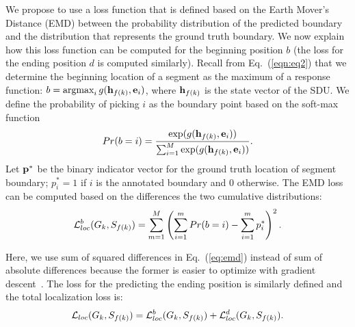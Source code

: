 \documentclass[10pt,journal,compsoc]{IEEEtran}
\begin{document}

 We propose to use a loss function that is defined based on the Earth Mover's Distance (EMD) between the probability distribution of the predicted boundary and the distribution that represents the ground truth boundary. We now explain how this loss function can be computed for the beginning position $b$ (the loss for the ending position $d$ is computed similarly).  Recall from Eq.~(\ref{eqn:eq2}) that  we determine the beginning location of a segment as the maximum of a response function: $b =  \mathop{\textrm{argmax}}_{i} g({\bf h}_{f(k)}, {\bf e}_i)$, where ${\bf h}_{f(k)}$ is the state vector of the SDU. We define the probability of picking $i$ as the boundary point based on the soft-max function 
\begin{align}
Pr(b =i) = \frac{\exp(g({\bf h}_{f(k)}, {\bf e}_i))}{\sum_{i=1}^{M} \exp(g({\bf h}_{f(k)}, {\bf e}_i))}.	
\end{align}
Let ${\bf p}^*$ be the binary indicator vector for the ground truth location of segment boundary; $p^*_i =1$ if $i$ is the annotated boundary and $0$ otherwise. The EMD loss can be computed based on the differences the two cumulative distributions: 
\begin{align}
\mL_{loc}^b(G_k, S_{f(k)}) = \sum_{m=1}^{M} \left( \sum_{i=1}^m Pr(b=i) - \sum_{i=1}^m p^*_i\right)^2.\label{eq:emd}
\end{align}

Here, we use sum of squared differences in Eq.~(\ref{eq:emd}) instead of sum of absolute differences because the former is easier to optimize with gradient descent~\cite{hou2016squared,shalev2011stochastic,luenberger1973introduction}.  The loss for the predicting the ending position is similarly defined and the total localization loss is:  
\begin{align}
\mathcal{L}_{loc}(G_k, S_{f(k)}) = \mathcal{L}_{loc}^b(G_k, S_{f(k)})+ \mathcal{L}_{loc}^d(G_k, S_{f(k)}). 	
\end{align}
\end{document}
